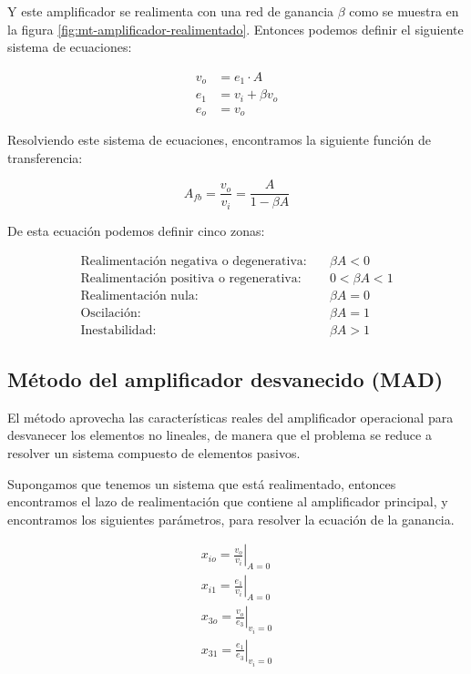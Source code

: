 Y este amplificador se realimenta con una red de ganancia $\beta$ como se muestra en la figura \ref{fig:mt-amplificador-realimentado}. Entonces podemos definir el siguiente sistema de ecuaciones:

\begin{align*}
    v_o & = e_1 \cdot A \\
    e_1 & = v_i + \beta v_o \\
    e_o & = v_o
\end{align*}

Resolviendo este sistema de ecuaciones, encontramos la siguiente función de transferencia:

\begin{equation}
    \boxed{A_{fb} = \frac{v_o}{v_i} = \frac{A}{1 - \beta A}}
    \label{eq:mt-func-transferencia-realimentacion}
\end{equation}

De esta ecuación podemos definir cinco zonas:

\begin{align*}
\text{Realimentación negativa o degenerativa:} & \quad \beta A < 0 \\
\text{Realimentación positiva o regenerativa:} & \quad 0 < \beta A < 1 \\
\text{Realimentación nula:} & \quad \beta A = 0 \\
\text{Oscilación:} & \quad \beta A = 1 \\
\text{Inestabilidad:} & \quad \beta A > 1
\end{align*}

\subsection{Método del amplificador desvanecido (MAD)}

 El método aprovecha las características reales del
amplificador operacional para desvanecer los elementos no lineales, de manera que el problema se reduce a resolver un sistema compuesto de elementos pasivos.

Supongamos que tenemos un sistema que está realimentado, entonces encontramos el lazo de realimentación que contiene al amplificador principal,
y encontramos los siguientes parámetros, para resolver la ecuación de la ganancia.


\begin{align*}
    x_{io} = \left. \frac{v_o}{v_i} \right|_{A=0} \\
    x_{i1} = \left. \frac{e_1}{v_i} \right|_{A=0} \\
    x_{3o} = \left. \frac{v_o}{e_3} \right|_{v_i=0} \\
    x_{31} = \left. \frac{e_1}{e_3} \right|_{v_i=0}
\end{align*}

